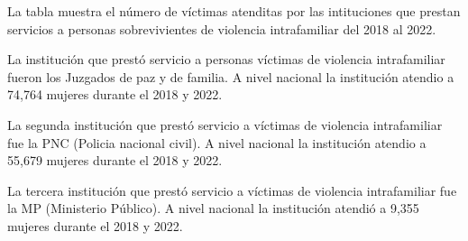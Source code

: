 La tabla muestra el número de víctimas atenditas por las intituciones que prestan servicios a personas sobrevivientes de violencia intrafamiliar del 2018 al 2022. 

La institución que prestó servicio a personas víctimas de violencia intrafamiliar fueron los Juzgados de paz y de familia. A nivel nacional la institución atendio a 74,764 mujeres durante el 2018 y 2022.

La segunda institución que prestó servicio a víctimas de violencia intrafamiliar fue la PNC (Policia nacional civil). A nivel nacional la institución atendio a 55,679 mujeres durante el 2018 y 2022.

La tercera institución que prestó servicio a víctimas de violencia intrafamiliar fue la MP (Ministerio Público). A nivel nacional la institución atendió a 9,355 mujeres durante el 2018 y 2022.